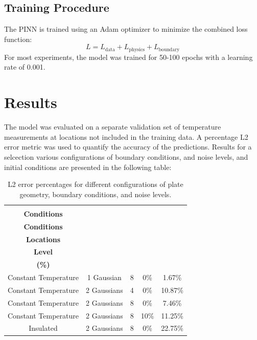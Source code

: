 \documentclass[10pt]{article}
\begin{document}
\subsection{Training Procedure}
The PINN is trained using an Adam optimizer to minimize the combined loss function:
\[L = L_{\text{data}} + L_{\text{physics}} + L_{\text{boundary}}\]
For most experiments, the model was trained for 50-100 epochs with a learning rate of 0.001. 

\section{Results}
The model was evaluated on a separate validation set of temperature measurements at locations not included in the training data. A percentage L2 error metric was used to quantify the accuracy of the predictions. Results for a selcection various configurations of boundary conditions, and noise levels, and initial conditions are presented in the following table:
\begin{table}[ht]
\centering
\begin{tabular}{|c|c|c|c|c|}
\hline
\shortstack{\textbf{Boundary}\\\textbf{Conditions}} &
\shortstack{\textbf{Initial}\\\textbf{Conditions}} &
\shortstack{\textbf{\# Measurement}\\\textbf{Locations}} &
\shortstack{\textbf{Noise}\\\textbf{Level}} &
\shortstack{\textbf{L2 Error}\\\textbf{(\%)}} \\
\hline
Constant Temperature & 1 Gaussian & 8 & 0\% & 1.67\% \\
Constant Temperature & 2 Gaussians & 4 & 0\% & 10.87\% \\
Constant Temperature & 2 Gaussians & 8 & 0\% & 7.46\% \\
Constant Temperature & 2 Gaussians & 8 & 10\% & 11.25\% \\
Insulated & 2 Gaussians & 8 & 0\% & 22.75\% \\
\hline
\end{tabular}
\caption{L2 error percentages for different configurations of plate geometry, boundary conditions, and noise
levels.}
\end{table}

\newpage
\end{document}
